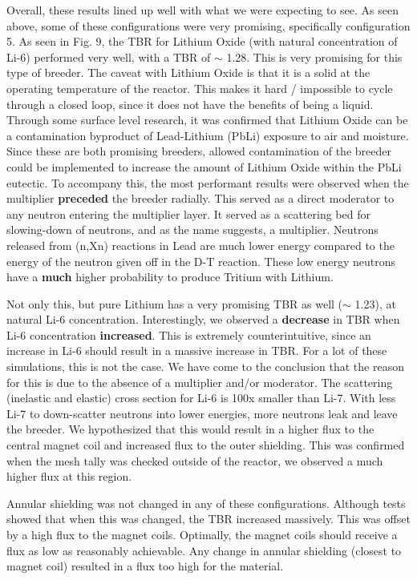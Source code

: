 \documentclass{article}
\begin{document}
\bigskip

Overall, these results lined up well with what we were expecting to see. As seen above, some of these configurations were very promising, specifically configuration 5. As seen in Fig. 9, the TBR for Lithium Oxide (with natural concentration of Li-6) performed very well, with a TBR of $\sim$ 1.28. This is very promising for this type of breeder. The caveat with Lithium Oxide is that it is a solid at the operating temperature of the reactor. This makes it hard / impossible to cycle through a closed loop, since it does not have the benefits of being a liquid. Through some surface level research, it was confirmed that Lithium Oxide can be a contamination byproduct of Lead-Lithium (PbLi) exposure to air and moisture. Since these are both promising breeders, allowed contamination of the breeder could be implemented to increase the amount of Lithium Oxide within the PbLi eutectic. To accompany this, the most performant results were observed when the multiplier \textbf{preceded} the breeder radially. This served as a direct moderator to any neutron entering the multiplier layer. It served as a scattering bed for slowing-down of neutrons, and as the name suggests, a multiplier. Neutrons released from (n,Xn) reactions in Lead are much lower energy compared to the energy of the neutron given off in the D-T reaction. These low energy neutrons have a \textbf{much} higher probability to produce Tritium with Lithium.

\medskip

Not only this, but pure Lithium has a very promising TBR as well ($\sim$ 1.23), at natural Li-6 concentration. Interestingly, we observed a \textbf{decrease} in TBR when Li-6 concentration \textbf{increased}. This is extremely counterintuitive, since an increase in Li-6 should result in a massive increase in TBR. For a lot of these simulations, this is not the case. We have come to the conclusion that the reason for this is due to the absence of a multiplier and/or moderator. The scattering (inelastic and elastic) cross section for Li-6 is 100x smaller than Li-7. With less Li-7 to down-scatter neutrons into lower energies, more neutrons leak and leave the breeder. We hypothesized that this would result in a higher flux to the central magnet coil and increased flux to the outer shielding. This was confirmed when the mesh tally was checked outside of the reactor, we observed a much higher flux at this region. 

\medskip

Annular shielding was not changed in any of these configurations. Although tests showed that when this was changed, the TBR increased massively. This was offset by a high flux to the magnet coils. Optimally, the magnet coils should receive a flux as low as reasonably achievable. Any change in annular shielding (closest to magnet coil) resulted in a flux too high for the material. 
\end{document}
